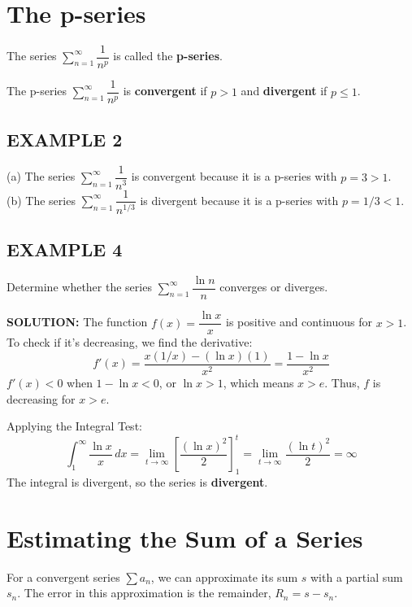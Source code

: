 \documentclass{article}
\begin{document}
\section*{The p-series}
The series \( \sum_{n=1}^{\infty} \dfrac{1}{n^p} \) is called the \textbf{p-series}.

\begin{tcolorbox}[
    colback=white,
    colframe=orange!80!white,
    title=Convergence of a p-series,
    boxrule=0.5mm,
    arc=3mm
    ]
    The p-series \( \sum_{n=1}^{\infty} \dfrac{1}{n^p} \) is \textbf{convergent} if \(p > 1\) and \textbf{divergent} if \(p \le 1\).
\end{tcolorbox}

\subsection*{EXAMPLE 2}
(a) The series \( \sum_{n=1}^{\infty} \dfrac{1}{n^3} \) is convergent because it is a p-series with \(p = 3 > 1\). \\
(b) The series \( \sum_{n=1}^{\infty} \dfrac{1}{n^{1/3}} \) is divergent because it is a p-series with \(p = 1/3 < 1\).

\subsection*{EXAMPLE 4}
Determine whether the series \( \sum_{n=1}^{\infty} \dfrac{\ln n}{n} \) converges or diverges.

\textbf{SOLUTION:}
The function \(f(x) = \dfrac{\ln x}{x}\) is positive and continuous for \(x>1\). To check if it's decreasing, we find the derivative:
\[ f'(x) = \dfrac{x(1/x) - (\ln x)(1)}{x^2} = \dfrac{1 - \ln x}{x^2} \]
\(f'(x) < 0\) when \(1 - \ln x < 0\), or \(\ln x > 1\), which means \(x > e\). Thus, \(f\) is decreasing for \(x > e\).

Applying the Integral Test:
\[ \int_1^\infty \dfrac{\ln x}{x} \,dx = \lim_{t\to\infty} \left[ \dfrac{(\ln x)^2}{2} \right]_1^t = \lim_{t\to\infty} \dfrac{(\ln t)^2}{2} = \infty \]
The integral is divergent, so the series is \textbf{divergent}.

\section*{Estimating the Sum of a Series}
For a convergent series \( \sum a_n \), we can approximate its sum \(s\) with a partial sum \(s_n\). The error in this approximation is the remainder, \(R_n = s - s_n\).
\end{document}
